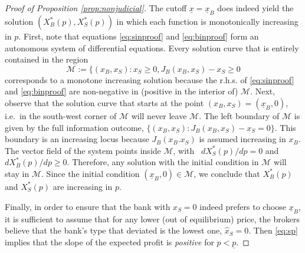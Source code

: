 \documentclass[11pt,twopage]{article}
\begin{document}
\begin{proof}[Proof of Proposition \ref{prop:nonjudicial}]
  The cutoff $\underline x = \underline x_B$ does indeed yield the
  solution $(X_B^*(p),X_S^*(p))$ in which each function is
  monotonically increasing in $p$. First, note that equations
  \eqref{eq:sinproof} and \eqref{eq:binproof} form an autonomous
  system of differential equations. Every solution curve that is
  entirely contained in the region \[\mathcal M := \{ (x_B,x_S):
  x_S\geq 0, J_B(x_B,x_S) - x_S \geq 0 \] corresponds to a monotone
  increasing solution because the r.h.s. of \eqref{eq:sinproof} and
  \eqref{eq:binproof} are non-negative in (positive in the interior
  of) $\mathcal M$. Next, observe that the solution curve that starts
  at the point $(x_B,x_S) = (\underline x_B,0)$, i.e.\ in the
  south-west corner of $\mathcal M$ will never leave $\mathcal M$. The
  left boundary of $\mathcal M$ is given by the full information
  outcome, $\{ (x_B,x_S): J_B(x_B,x_S) - x_S = 0 \}$. This boundary is
  an increasing locus because $J_B(x_B.x_S)$ is assumed increasing in
  $x_B$. The vector field of the system points inside $\mathcal M$,
  with \ $dX_S^*(p)/dp = 0$ and $dX_B^*(p)/dp \geq 0$. Therefore, any
  solution with the initial condition in $\mathcal M$ will stay in
  $\mathcal M$. Since the initial condition $(\underline x_B, 0) \in
  \mathcal M$, we conclude that $X_B^*(p)$ and $X_S^*(p)$ are
  increasing in $p$.
%
%
%


  Finally, in order to ensure that the bank with $x_S = 0$ indeed
  prefers to choose $\underline x_B$, it is sufficient to assume that
  for any lower (out of equilibrium) price, the brokers believe that
  the bank's type that deviated is the lowest one, $\hat x_S =
  0$. Then \eqref{eq:sp} implies that the slope of the expected profit
  is \emph{positive} for $p < \underline p$.


\end{proof}
\end{document}

